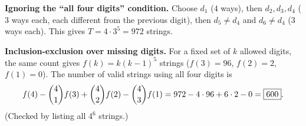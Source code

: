 \textbf{Ignoring the ``all four digits'' condition.} Choose $d_1$ ($4$ ways), then $d_2,d_3,d_4$ ($3$ ways each, each different from the previous digit), then $d_5\ne d_4$ and $d_6\ne d_4$ ($3$ ways each). This gives $T=4\cdot3^5=972$ strings.

\textbf{Inclusion-exclusion over missing digits.} For a fixed set of $k$ allowed digits, the same count gives $f(k)=k(k-1)^5$ strings ($f(3)=96$, $f(2)=2$, $f(1)=0$). The number of valid strings using all four digits is
\[
f(4)-\dbinom41f(3)+\dbinom42f(2)-\dbinom43f(1)=972-4\cdot96+6\cdot2-0=\boxed{600}.
\]
(Checked by listing all $4^6$ strings.)
